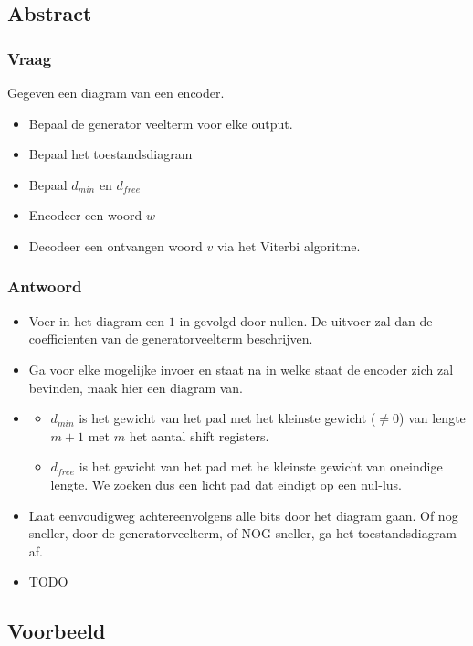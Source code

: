 \documentclass[main.tex]{subfiles}
\begin{document}
\subsection*{Abstract}

\subsubsection*{Vraag}
Gegeven een diagram van een encoder.
\begin{itemize}
\item Bepaal de generator veelterm voor elke output.
\item Bepaal het toestandsdiagram
\item Bepaal $d_{min}$ en $d_{free}$
\item Encodeer een woord $w$
\item Decodeer een ontvangen woord $v$ via het Viterbi algoritme.
\end{itemize}

\subsubsection*{Antwoord}
\begin{itemize}
\item Voer in het diagram een $1$ in gevolgd door nullen.
De uitvoer zal dan de coefficienten van de generatorveelterm beschrijven.
\item Ga voor elke mogelijke invoer en staat na in welke staat de encoder zich zal bevinden, maak hier een diagram van.
\item
  \begin{itemize}
  \item $d_{min}$ is het gewicht van het pad met het kleinste gewicht ($\neq 0$) van lengte $m+1$ met $m$ het aantal shift registers.
  \item $d_{free}$ is het gewicht van het pad met he kleinste gewicht van oneindige lengte. We zoeken dus een licht pad dat eindigt op een nul-lus.
  \end{itemize}
\item Laat eenvoudigweg achtereenvolgens alle bits door het diagram gaan.
  Of nog sneller, door de generatorveelterm, of NOG sneller, ga het toestandsdiagram af.
\item TODO
\end{itemize}

\subsection*{Voorbeeld}
\end{document}
